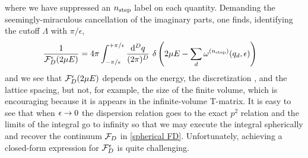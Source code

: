 where we have suppressed an ${n_\text{step}}$ label on each quantity.
Demanding the seemingly-miraculous cancellation of the imaginary parts, one finds, identifying the cutoff $\Lambda$ with $\pi/\epsilon$,
\begin{align}
    \frac{1}{\mathcal{F}_D^\epsilon(2\mu E)} &= 4\pi \int_{-\pi/\epsilon}^{+\pi/\epsilon} \frac{\mathrm{d}^D q}{(2\pi)^D}\
    \delta\left(2\mu E - \sum_d \omega^{({n_\text{step}})}(q_d,\epsilon)\right)
\end{align}
and we see that $\mathcal{F}_D^\epsilon(2\mu E)$ depends on the energy, the discretization \nstep, and the lattice spacing, but not, for example, the size of the finite volume, which is encouraging because it is appears in the infinite-volume T-matrix.
It is easy to see that when $\epsilon\rightarrow0$ the dispersion relation goes to the exact $p^2$ relation and the limits of the integral go to infinity so that we may execute the integral spherically and recover the continuum $\mathcal{F}_D$ in \eqref{spherical FD}.
Unfortunately, achieving a closed-form expression for $\mathcal{F}_D^\epsilon$ is quite challenging.

